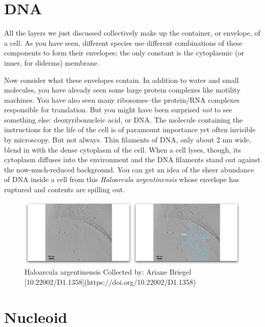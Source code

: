 \documentclass[]{tufte-book}
\begin{document}
\section{DNA}\label{dna}

All the layers we just discussed collectively make up the container, or
envelope, of a cell. As you have seen, different species use different
combinations of these components to form their envelopes; the only
constant is the cytoplasmic (or inner, for diderms) membrane.

Now consider what these envelopes contain. In addition to water and
small molecules, you have already seen some large protein complexes like
motility machines. You have also seen many ribosomes--the protein/RNA
complexes responsible for translation. But you might have been surprised
\emph{not} to see something else: deoxyribonucleic acid, or DNA. The
molecule containing the instructions for the life of the cell is of
paramount importance yet often invisible by microscopy. But not always.
Thin filaments of DNA, only about 2 nm wide, blend in with the dense
cytoplasm of the cell. When a cell lyses, though, its cytoplasm diffuses
into the environment and the DNA filaments stand out against the
now-much-reduced background. You can get an idea of the sheer abundance
of DNA inside a cell from this \emph{Haloarcula argentinensis} whose
envelope has ruptured and contents are spilling out.

\begin{figure}
\includegraphics{movie_stills/2_9} \caption[Haloarcula argentinensis Collected by]{Haloarcula argentinensis Collected by: Ariane Briegel [10.22002/D1.1358](https://doi.org/10.22002/D1.1358)}\label{fig:unnamed-chunk-43}
\end{figure}

\section{Nucleoid}\label{nucleoid}
\end{document}
